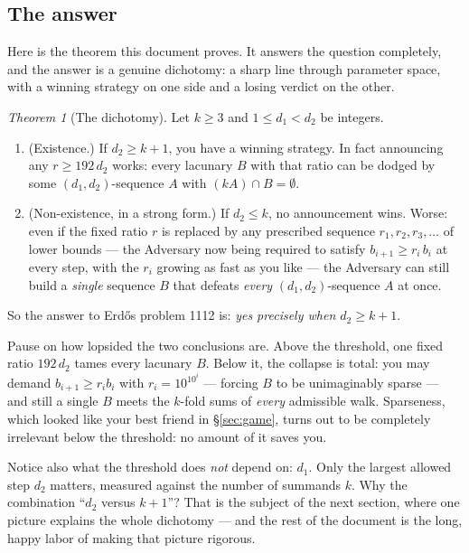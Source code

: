 \documentclass[11pt,reqno]{amsart}
\theoremstyle{plain}
\theoremstyle{definition}
\theoremstyle{remark}
\newtheorem{maintheorem}{Theorem}
\begin{document}
\subsection{The answer}\label{sec:answer}

Here is the theorem this document proves. It answers the question completely, and the
answer is a genuine dichotomy: a sharp line through parameter space, with a winning
strategy on one side and a losing verdict on the other.

\begin{maintheorem}[The dichotomy]\label{thm:main-friendly}
Let $k \ge 3$ and $1 \le d_1 < d_2$ be integers.
\begin{enumerate}
\item \textup{(Existence.)} If $d_2 \ge k+1$, you have a winning strategy. In fact
      announcing any $r \ge 192\, d_2$ works: every lacunary $B$ with that ratio can
      be dodged by some $(d_1,d_2)$-sequence $A$ with $(kA) \cap B = \emptyset$.
\item \textup{(Non-existence, in a strong form.)} If $d_2 \le k$, no announcement
      wins. Worse: even if the fixed ratio $r$ is replaced by any prescribed sequence
      $r_1, r_2, r_3, \dots$ of lower bounds --- the Adversary now being required to
      satisfy $b_{i+1} \ge r_i\, b_i$ at every step, with the $r_i$ growing as fast as
      you like --- the Adversary can still build a \emph{single} sequence $B$ that
      defeats \emph{every} $(d_1,d_2)$-sequence $A$ at once.
\end{enumerate}
So the answer to Erd\H{o}s problem 1112 is: \emph{yes precisely when $d_2 \ge k+1$}.
\end{maintheorem}

Pause on how lopsided the two conclusions are. Above the threshold, one fixed ratio
$192\,d_2$ tames every lacunary $B$. Below it, the collapse is total: you may demand
$b_{i+1} \ge r_i b_i$ with $r_i = 10^{10^i}$ --- forcing $B$ to be unimaginably sparse
--- and still a single $B$ meets the $k$-fold sums of \emph{every} admissible walk.
Sparseness, which looked like your best friend in \S\ref{sec:game}, turns out to be
completely irrelevant below the threshold: no amount of it saves you.

Notice also what the threshold does \emph{not} depend on: $d_1$. Only the largest
allowed step $d_2$ matters, measured against the number of summands $k$. Why the
combination ``$d_2$ versus $k+1$''? That is the subject of the next section, where one
picture explains the whole dichotomy --- and the rest of the document is the long,
happy labor of making that picture rigorous.
\end{document}
